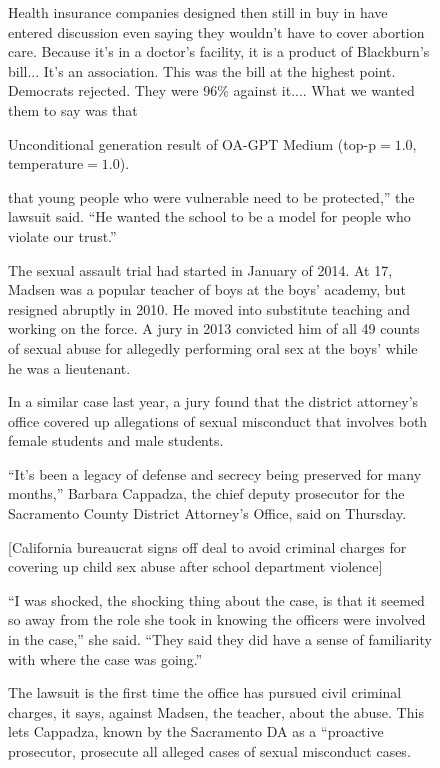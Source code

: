 \begin{figure}[p]
\begin{minipage}{\textwidth}
{Health insurance companies designed then still in buy in have entered discussion even saying they wouldn't have to cover abortion care. Because it's in a doctor's facility, it is a product of Blackburn's bill... It's an association. This was the bill at the highest point. Democrats rejected. They were 96\% against it.... What we wanted them to say was that
}
  \end{minipage}
\caption{Unconditional generation result of OA-GPT Medium (top-p$=1.0$, temperature$=1.0$).}
\label{fig:text1.01.0}
\end{figure} 


\begin{figure}[p] %
  \centering
  \begin{minipage}{\textwidth}\small
{\sffamily
that young people who were vulnerable need to be protected,” the lawsuit said. “He wanted the school to be a model for people who violate our trust.”

The sexual assault trial had started in January of 2014. At 17, Madsen was a popular teacher of boys at the boys’ academy, but resigned abruptly in 2010. He moved into substitute teaching and working on the force. A jury in 2013 convicted him of all 49 counts of sexual abuse for allegedly performing oral sex at the boys’ while he was a lieutenant.

In a similar case last year, a jury found that the district attorney’s office covered up allegations of sexual misconduct that involves both female students and male students.

“It’s been a legacy of defense and secrecy being preserved for many months,” Barbara Cappadza, the chief deputy prosecutor for the Sacramento County District Attorney’s Office, said on Thursday.

[California bureaucrat signs off deal to avoid criminal charges for covering up child sex abuse after school department violence]

“I was shocked, the shocking thing about the case, is that it seemed so away from the role she took in knowing the officers were involved in the case,” she said. “They said they did have a sense of familiarity with where the case was going.”

The lawsuit is the first time the office has pursued civil criminal charges, it says, against Madsen, the teacher, about the abuse. This lets Cappadza, known by the Sacramento DA as a “proactive prosecutor, prosecute all alleged cases of sexual misconduct cases.

}
\end{minipage}
\end{figure}
